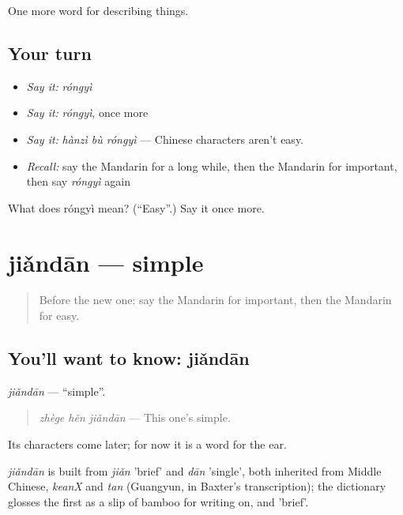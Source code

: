 \begin{grammarlens}[title={What you've built}]
One more word for describing things.
\end{grammarlens}

\subsection*{Your turn}
\begin{itemize}
\raggedright
  \item \emph{Say it:} \emph{róngyì}
  \item \emph{Say it:} \emph{róngyì}, once more
  \item \emph{Say it:} \emph{hànzì bù róngyì} — Chinese characters aren't easy.
  \item \emph{Recall:} say the Mandarin for a long while, then the Mandarin for important, then say \emph{róngyì} again
\end{itemize}

\begin{tcolorbox}[breakable,colback=teal!4,colframe=teal!35!black,title={Before you move on}]
What does róngyì mean? (\textquotedblleft{}Easy\textquotedblright{}.) Say it once more.
\end{tcolorbox}
\section[jiǎndān]{jiǎndān — simple}

\label{lesson:ZH-C144-jiandan}



\begin{quote}
Before the new one: say the Mandarin for important, then the Mandarin for easy.
\end{quote}

\subsection*{You'll want to know: jiǎndān}
\emph{jiǎndān} — \textquotedblleft{}simple\textquotedblright{}.

\begin{quote}
\emph{zhège hěn jiǎndān} — This one's simple.
\end{quote}

Its characters come later; for now it is a word for the ear.

\begin{cousinweb}
\emph{jiǎndān} is built from \emph{jiǎn} 'brief' and \emph{dān} 'single', both inherited from Middle Chinese, \emph{keanX} and \emph{tan} (Guangyun, in Baxter's transcription); the dictionary glosses the first as a slip of bamboo for writing on, and 'brief'.
\end{cousinweb}

